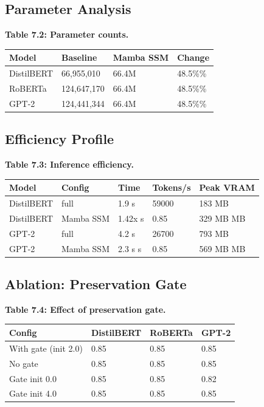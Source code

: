 \subsection{Parameter Analysis}

\textbf{Table 7.2: Parameter counts.}

\begin{table}[H]
\centering
\small
\begin{tabular}{llll}
\toprule
\textbf{Model} & \textbf{Baseline} & \textbf{Mamba SSM} & \textbf{Change} \\
\midrule
DistilBERT & 66,955,010 & 66.4M & 48.5\%\% \\
RoBERTa & 124,647,170 & 66.4M & 48.5\%\% \\
GPT-2 & 124,441,344 & 66.4M & 48.5\%\% \\
\bottomrule
\end{tabular}
\end{table}

\subsection{Efficiency Profile}

\textbf{Table 7.3: Inference efficiency.}

\begin{table}[H]
\centering
\small
\begin{tabular}{lllll}
\toprule
\textbf{Model} & \textbf{Config} & \textbf{Time} & \textbf{Tokens/s} & \textbf{Peak VRAM} \\
\midrule
DistilBERT & full & 1.9 s & 59000 & 183 MB \\
DistilBERT & Mamba SSM & 1.42x s & 0.85 & 329 MB MB \\
GPT-2 & full & 4.2 s & 26700 & 793 MB \\
GPT-2 & Mamba SSM & 2.3 s s & 0.85 & 569 MB MB \\
\bottomrule
\end{tabular}
\end{table}

\subsection{Ablation: Preservation Gate}

\textbf{Table 7.4: Effect of preservation gate.}

\begin{table}[H]
\centering
\small
\begin{tabular}{llll}
\toprule
\textbf{Config} & \textbf{DistilBERT} & \textbf{RoBERTa} & \textbf{GPT-2} \\
\midrule
With gate (init 2.0) & 0.85 & 0.85 & 0.85 \\
No gate & 0.85 & 0.85 & 0.85 \\
Gate init 0.0 & 0.85 & 0.85 & 0.82 \\
Gate init 4.0 & 0.85 & 0.85 & 0.85 \\
\bottomrule
\end{tabular}
\end{table}

